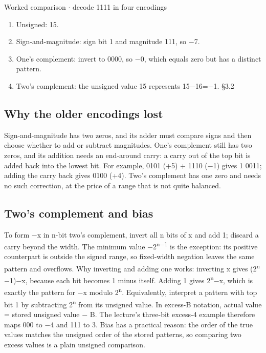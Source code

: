 \documentclass[11pt]{article}
\begin{document}
\begin{keepsection}
\begin{keepsection}
\begin{workedbox}{Worked comparison \ensuremath{\cdot} decode 1111 in four encodings}
\begin{enumerate}
\item Unsigned: 15.
\item Sign-and-magnitude: sign bit 1 and magnitude 111, so \ensuremath{-}7.
\item One’s complement: invert to 0000, so \ensuremath{-}0, which equals zero but has a distinct pattern.
\item Two’s complement: the unsigned value 15 represents 15\ensuremath{-}16=\ensuremath{-}1. \hfill{\small\color{FAUblue}§3.2}
\end{enumerate}
\end{workedbox}
\end{keepsection}

\begin{keepsection}
\subsection{Why the older encodings lost}

Sign-and-magnitude has two zeros, and its adder must compare signs and then choose whether to add or subtract magnitudes. One’s complement still has two zeros, and its addition needs an end-around carry: a carry out of the top bit is added back into the lowest bit. For example, 0101 (+5) + 1110 (\ensuremath{-}1) gives 1 0011; adding the carry back gives 0100 (+4). Two’s complement has one zero and needs no such correction, at the price of a range that is not quite balanced.
\end{keepsection}

\begin{keepsection}
\subsection{Two’s complement and bias}

To form \ensuremath{-}x in n-bit two’s complement, invert all n bits of x and add 1; discard a carry beyond the width. The minimum value \ensuremath{-}2\textsuperscript{n\ensuremath{-}1} is the exception: its positive counterpart is outside the signed range, so fixed-width negation leaves the same pattern and overflows. Why inverting and adding one works: inverting x gives (2\textsuperscript{n}\ensuremath{-}1)\ensuremath{-}x, because each bit becomes 1 minus itself. Adding 1 gives 2\textsuperscript{n}\ensuremath{-}x, which is exactly the pattern for \ensuremath{-}x modulo 2\textsuperscript{n}. Equivalently, interpret a pattern with top bit 1 by subtracting 2\textsuperscript{n} from its unsigned value. In excess-B notation, actual value = stored unsigned value \ensuremath{-} B. The lecture’s three-bit excess-4 example therefore maps 000 to \ensuremath{-}4 and 111 to 3. Bias has a practical reason: the order of the true values matches the unsigned order of the stored patterns, so comparing two excess values is a plain unsigned comparison.


\end{keepsection}
\end{keepsection}
\end{document}
